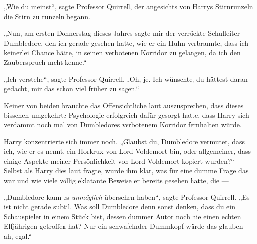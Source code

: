 „Wie du meinst“, sagte Professor Quirrell, der angesichts von Harrys Stirnrunzeln die Stirn zu runzeln begann.

„Nun, am ersten Donnerstag dieses Jahres sagte mir der verrückte Schulleiter Dumbledore, den ich gerade gesehen hatte, wie er ein Huhn verbrannte, dass ich keinerlei Chance hätte, in seinen verbotenen Korridor zu gelangen, da ich den Zauberspruch  nicht kenne.“

„Ich verstehe“, sagte Professor Quirrell.
„Oh, je. Ich wünschte, du hättest daran gedacht, mir das schon viel früher zu sagen.“

Keiner von beiden brauchte das Offensichtliche laut auszusprechen, dass dieses bisschen umgekehrte Psychologie erfolgreich dafür gesorgt hatte, dass Harry sich verdammt noch mal von Dumbledores verbotenem Korridor fernhalten würde.

Harry konzentrierte sich immer noch.
„Glaubst du, Dumbledore vermutet, dass ich, wie er es nennt, ein Horkrux von Lord Voldemort bin, oder allgemeiner, dass einige Aspekte meiner Persönlichkeit von Lord Voldemort kopiert wurden?“ Selbst als Harry dies laut fragte, wurde ihm klar, was für eine dumme Frage das war und wie viele völlig eklatante Beweise er bereits gesehen hatte, die —

„Dumbledore kann es \emph{unmöglich} übersehen haben“, sagte Professor Quirrell.
„Es ist nicht gerade subtil. Was soll Dumbledore denn sonst denken, dass du ein Schauspieler in einem Stück bist, dessen dummer Autor noch nie einen echten Elfjährigen getroffen hat? Nur ein schwafelnder Dummkopf würde das glauben — ah, egal.“

